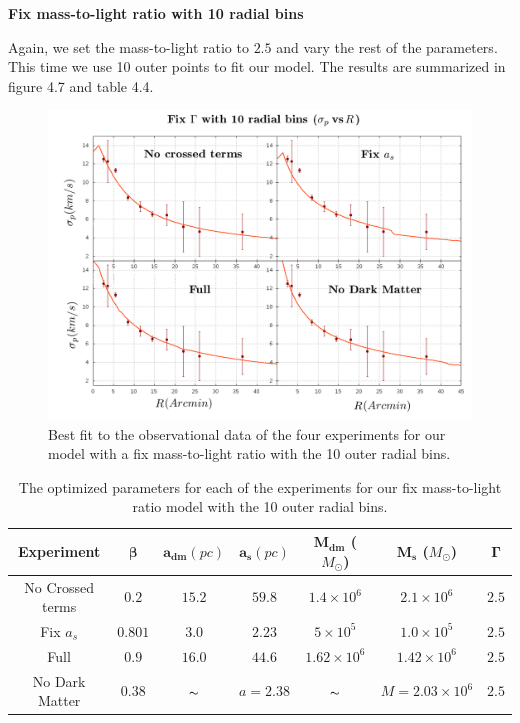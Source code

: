 \newpage

\begin{center}
\textbf{Fix mass-to-light ratio with 10 radial bins}
\end{center}

Again, we set the mass-to-light ratio to $2.5$ and vary the rest of the parameters. This time we use 10 outer points to fit our model. The results are summarized in figure 4.7 and table 4.4.

\begin{figure}[H]
\centering
\includegraphics[width=15cm]{images/fix_gamma_refinado_10.png}
\caption[Best fit of our model with a fix mass-to-light ratio for the 10 radial bins]{Best fit to the observational data of the four experiments for our model with a fix mass-to-light ratio with the 10 outer radial bins.}
\end{figure}

\begin{table}[H]
\begin{center}
\begin{tabular}{| c| c| c| c| c| c| c|}
    \hline
    \textbf{Experiment} & $\mathbf{\beta}$ & $\mathbf{a_{dm}} (pc)$ & $\mathbf{a_{s}} (pc)$ & $\mathbf{M_{dm}}$ ($M_{\odot}$) & $\mathbf{M_{s}}$ ($M_{\odot}$) & $\mathbf{\Gamma}$\\ \hline
	No Crossed terms & $0.2$ &	$15.2$ &	$59.8$ &	$1.4 \times 10^{6}$ &	$2.1 \times 10^{6}$ &	$2.5$\\ \hline
	Fix $a_s$ &	$0.801$ &	$3.0$ &	$2.23$ &	$5 \times 10^{5}$ &	$1.0 \times 10 ^{5}$ &	$2.5$\\ \hline
	Full &	$0.9$ &	$16.0$ &	$44.6$ &	$1.62 \times 10^{6}$ &	$1.42 \times 10^{6}$ &	$2.5$\\ \hline
	No Dark Matter &	$0.38$ &	$\thicksim$ & $ a = 2.38$ &	$\thicksim$ & $  M = 2.03 \times 10^{6}$ & 	$2.5$\\
    \hline
  \end{tabular} 
\caption[Optimized parameters for our fix mass-to-light ratio model with the 10 outer radial bins.]{The optimized parameters for each of the experiments for our fix mass-to-light ratio model with the 10 outer radial bins.}
\end{center}
\end{table}

